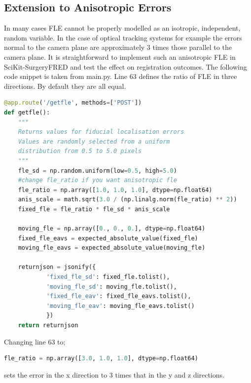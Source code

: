 \subsection{Extension to Anisotropic Errors}
\label{sec:anis_method}
In many cases {FLE} cannot be properly modelled as an isotropic, independent, random variable. In the case of optical tracking systems for example \cite{10.1117/12.536128} the errors normal to the camera plane are approximately 3 times those parallel to the camera plane. It is straightforward to implement such an anisotropic \gls{FLE} in SciKit-SurgeryFRED and test the effect on registration outcomes.
The following code snippet is taken from  main.py. Line 63 defines the ratio of \gls{FLE} in three directions. By default they are all equal.

\begin{lstlisting}[language=python, firstnumber = 54]
@app.route('/getfle', methods=['POST'])
def getfle():
    """
    Returns values for fiducial localisation errors
    Values are randomly selected from a uniform
    distribution from 0.5 to 5.0 pixels
    """
    fle_sd = np.random.uniform(low=0.5, high=5.0)
    #change fle_ratio if you want anisotropic fle
    fle_ratio = np.array([1.0, 1.0, 1.0], dtype=np.float64)
    anis_scale = math.sqrt(3.0 / (np.linalg.norm(fle_ratio) ** 2))
    fixed_fle = fle_ratio * fle_sd * anis_scale

    moving_fle = np.array([0., 0., 0.], dtype=np.float64)
    fixed_fle_eavs = expected_absolute_value(fixed_fle)
    moving_fle_eavs = expected_absolute_value(moving_fle)

    returnjson = jsonify({
            'fixed_fle_sd': fixed_fle.tolist(),
            'moving_fle_sd': moving_fle.tolist(),
            'fixed_fle_eav': fixed_fle_eavs.tolist(),
            'moving_fle_eav': moving_fle_eavs.tolist()
            })
    return returnjson
\end{lstlisting}

Changing line 63 to;
\begin{lstlisting}[language=python, firstnumber=63]
    fle_ratio = np.array([3.0, 1.0, 1.0], dtype=np.float64)
\end{lstlisting}
sets the error in the x direction to 3 times that in the y and z directions.  

